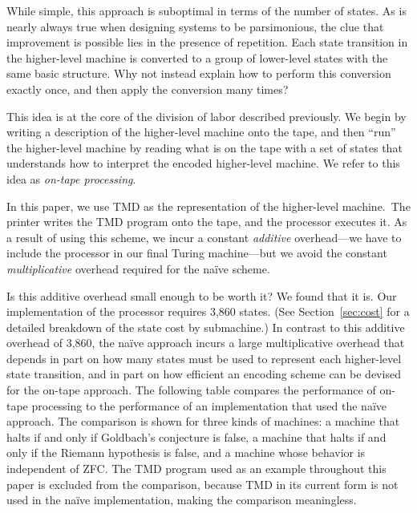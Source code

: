 \documentclass[11pt]{article}
\begin{document}
While simple, this approach is suboptimal in terms of the number of states. As is nearly always true when designing systems to be parsimonious, the clue that improvement is possible lies in the presence of repetition. Each state transition in the higher-level machine is converted to a group of lower-level states with the same basic structure. Why not instead explain how to perform this conversion exactly once, and then apply the conversion many times?

This idea is at the core of the division of labor described previously. We begin by writing a description of the higher-level machine onto the tape, and then ``run'' the higher-level machine by reading what is on the tape with a set of states that understands how to interpret the encoded higher-level machine. We refer to this idea as \emph{on-tape processing}.

In this paper, we use TMD as the representation of the higher-level machine.\footnotemark~The printer writes the TMD program onto the tape, and the processor executes it. As a result of using this scheme, we incur a constant \emph{additive} overhead---we have to include the processor in our final Turing machine---but we avoid the constant \emph{multiplicative} overhead required for the na\"ive scheme. 

Is this additive overhead small enough to be worth it? We found that it is. Our implementation of the processor requires 3,860 states. (See Section~\ref{sec:cost} for a detailed breakdown of the state cost by submachine.) In contrast to this additive overhead of 3,860, the na\"ive approach incurs a large multiplicative overhead that depends in part on how many states must be used to represent each higher-level state transition, and in part on how efficient an encoding scheme can be devised for the on-tape approach. The following table compares the performance of on-tape processing to the performance of an implementation that used the na\"ive approach. The comparison is shown for three kinds of machines: a machine that halts if and only if Goldbach's conjecture is false, a machine that halts if and only if the Riemann hypothesis is false, and a machine whose behavior is independent of ZFC. The TMD program used as an example throughout this paper is excluded from the comparison, because TMD in its current form is not used in the na\"ive implementation, making the comparison meaningless.
\end{document}
